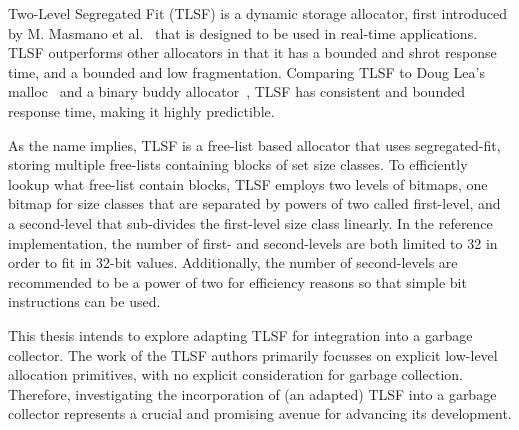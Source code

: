 
Two-Level Segregated Fit (TLSF) is a dynamic storage allocator, first introduced by M. Masmano et al.~\cite{TLSF} that is designed to be used in real-time applications. TLSF outperforms other allocators in that it has a bounded and shrot response time, and a bounded and low fragmentation. Comparing TLSF to Doug Lea's malloc~\cite{dlmalloc} and a binary buddy allocator~\cite{binarybuddy}, TLSF has consistent and bounded response time, making it highly predictible.

As the name implies, TLSF is a free-list based allocator that uses segregated-fit, storing multiple free-lists containing blocks of set size classes. To efficiently lookup what free-list contain blocks, TLSF employs two levels of bitmaps, one bitmap for size classes that are separated by powers of two called first-level, and a second-level that sub-divides the first-level size class linearly. In the reference implementation, the number of first- and second-levels are both limited to 32 in order to fit in 32-bit values. Additionally, the number of second-levels are recommended to be a power of two for efficiency reasons so that simple bit instructions can be used.

This thesis intends to explore adapting TLSF for integration into a garbage collector. The work of the TLSF authors primarily focusses on explicit low-level allocation primitives, with no explicit consideration for garbage collection. Therefore, investigating the incorporation of (an adapted) TLSF into a garbage collector represents a crucial and promising avenue for advancing its development.

